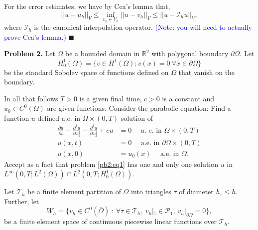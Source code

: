 \documentclass[11pt]{article}
\begin{document}
For the error estimates, we have by Cea's lemma that,
\begin{equation*}
    ||u - u_h ||_V \leq \inf_{v_h \in V_h} ||u - v_h||_V \leq ||u - \mathcal{I}_h u||_{V},
\end{equation*}
where $\mathcal{I}_h$ is the canonical interpolation operator.
\textcolor{blue}{(Note: you will need to actually prove Cea's lemma.)}
$\blacksquare$





\vskip 2cm

\textbf{Problem 2.} Let $\Omega$ be a bounded domain in $\mathbb{R}^2$ with polygonal boundary $\partial \Omega$. Let
\begin{equation}
    H_0^1(\Omega) = \{ v \in H^1(\Omega) : v(x) = 0 \: \forall x \in \partial \Omega \} 
\end{equation}
be the standard Sobolev space of functions defined on $\Omega$ that vanish on the boundary.

In all that follows $T > 0$ is a given final time, $c > 0$ is a constant and $u_0 \in C^0(\Omega)$ are given functions.
Consider the parabolic equation: Find a function $u$ defined a.e.  in $\Omega \times (0, T)$ solution of 
\begin{equation}
\begin{split} \label{pb2:eq1}
    \frac{\partial u}{\partial t}  - \frac{\partial ^2 u}{\partial x_1^2} - \frac{\partial^2 u}{\partial x_2^2} + cu &= 0 \quad \text{ a. e. in } \Omega \times (0,T) \\
    u(x,t) &= 0 \quad \text{ a.e. in } \partial \Omega \times (0,T) \\
    u(x,0) &= u_0(x) \quad \text{ a.e. in } \Omega.
\end{split}
\end{equation}
Accept as a fact that problem \eqref{pb2:eq1} has one and only one solution $u$ in $L^\infty(0,T; L^2(\Omega))\cap L^2(0,T; H^1_0(\Omega))$.

Let $\mathcal{T}_h$ be a finite element partition of $\Omega$ into triangles $\tau$ of diameter $h_\tau \leq h$. 
Further, let 
\begin{equation}
    W_h = \{ v_h \in C^0(\overline{\Omega}) \: : \: \forall \tau \in \mathcal{T}_h, \: v_h|_\tau \in \mathcal{P}_1, \: v_h|_{\partial \Omega} = 0 \},
\end{equation}
be a finite element space of continuous piecewise linear functions over $\mathcal{T}_h$.
\end{document}
